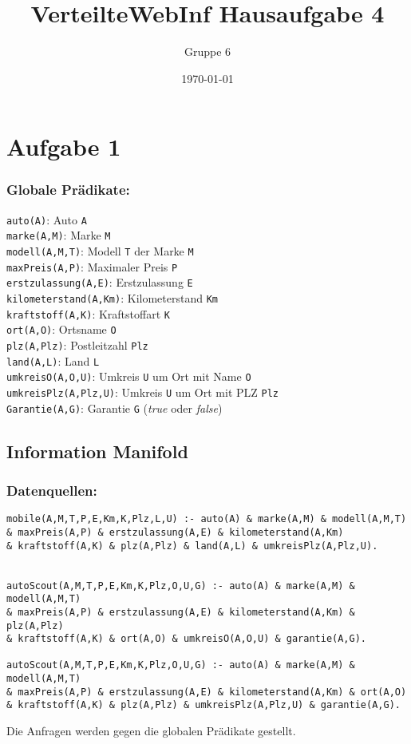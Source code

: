 \documentclass[a4paper]{article}
\author{Gruppe 6}
\title{\textbf{VerteilteWebInf Hausaufgabe 4}}
\date{\today}
\begin{document}
\maketitle


\section*{Aufgabe 1}

\subsubsection*{Globale Prädikate:}
\texttt{auto(A)}: Auto \texttt{A}\\
\texttt{marke(A,M)}: Marke \texttt{M} \\
\texttt{modell(A,M,T)}: Modell \texttt{T} der Marke \texttt{M}\\
\texttt{maxPreis(A,P)}: Maximaler Preis \texttt{P} \\
\texttt{erstzulassung(A,E)}: Erstzulassung \texttt{E} \\
\texttt{kilometerstand(A,Km)}: Kilometerstand \texttt{Km}\\
\texttt{kraftstoff(A,K)}: Kraftstoffart \texttt{K}\\
\texttt{ort(A,O)}: Ortsname \texttt{O}\\
\texttt{plz(A,Plz)}: Postleitzahl \texttt{Plz}\\
\texttt{land(A,L)}: Land \texttt{L}\\
\texttt{umkreisO(A,O,U)}: Umkreis \texttt{U} um Ort mit Name \texttt{O}\\
\texttt{umkreisPlz(A,Plz,U)}: Umkreis \texttt{U} um Ort mit PLZ \texttt{Plz} \\
\texttt{Garantie(A,G)}: Garantie \texttt{G} (\emph{true} oder \emph{false})\\


\subsection*{Information Manifold}


\subsubsection*{Datenquellen:}
\begin{verbatim}
mobile(A,M,T,P,E,Km,K,Plz,L,U) :- auto(A) & marke(A,M) & modell(A,M,T) 
& maxPreis(A,P) & erstzulassung(A,E) & kilometerstand(A,Km) 
& kraftstoff(A,K) & plz(A,Plz) & land(A,L) & umkreisPlz(A,Plz,U).


autoScout(A,M,T,P,E,Km,K,Plz,O,U,G) :- auto(A) & marke(A,M) & modell(A,M,T) 
& maxPreis(A,P) & erstzulassung(A,E) & kilometerstand(A,Km) & plz(A,Plz)
& kraftstoff(A,K) & ort(A,O) & umkreisO(A,O,U) & garantie(A,G).

autoScout(A,M,T,P,E,Km,K,Plz,O,U,G) :- auto(A) & marke(A,M) & modell(A,M,T) 
& maxPreis(A,P) & erstzulassung(A,E) & kilometerstand(A,Km) & ort(A,O)
& kraftstoff(A,K) & plz(A,Plz) & umkreisPlz(A,Plz,U) & garantie(A,G).
\end{verbatim}
Die Anfragen werden gegen die globalen Prädikate gestellt.
\end{document}
